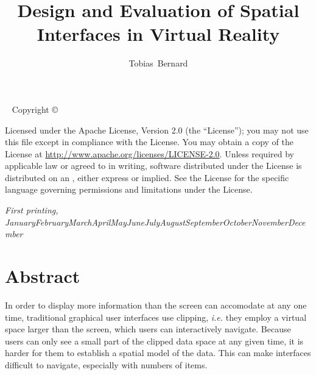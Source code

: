 \documentclass{tufte-book} %
\title{Design and Evaluation of Spatial Interfaces in Virtual Reality} %
\author[Tobias Bernard]{Tobias\ Bernard} %
\newcommand{\monthyear}{\ifcase\month\or January\or February\or March\or April\or May\or June\or July\or August\or September\or October\or November\or December\fi\space\number\year} %
\newcommand{\hairsp}{\hspace{1pt}} %
\newcommand{\ie}{\textit{i.\hairsp{}e.}\xspace} %
\begin{document}
\frontmatter



\maketitlepage %


\newpage
\begin{fullwidth}
~\vfill
\thispagestyle{empty}
\setlength{\parindent}{0pt}
\setlength{\parskip}{\baselineskip}
Copyright \copyright\ \the\year\ \thanklessauthor

\par{}

\par{}

\par Licensed under the Apache License, Version 2.0 (the ``License''); you may not use this file except in compliance with the License. You may obtain a copy of the License at \url{http://www.apache.org/licenses/LICENSE-2.0}. Unless required by applicable law or agreed to in writing, software distributed under the License is distributed on an , either express or implied. See the License for the specific language governing permissions and limitations under the License.

\par\textit{First printing, \monthyear}
\end{fullwidth}


\tableofcontents %


\mainmatter


\chapter{Abstract}

In order to display more information than the screen can accomodate at any one time, traditional graphical user interfaces use clipping, \ie they employ a virtual space larger than the screen, which users can interactively navigate. Because users can only see a small part of the clipped data space at any given time, it is harder for them to establish a spatial model of the data. This can make interfaces difficult to navigate, especially with numbers of items.
\end{document}
